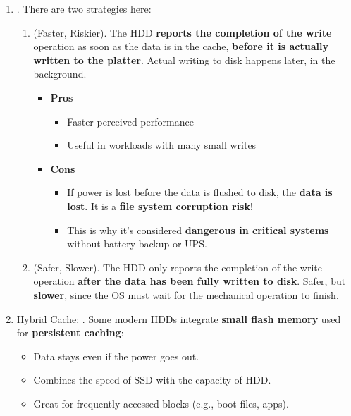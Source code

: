 \begin{enumerate}
    \item {}. There are two strategies here:
    \begin{enumerate}
        \item {} (Faster, Riskier). The HDD \textbf{reports the completion of the write} operation as soon as the data is in the cache, \textbf{before it is actually written to the platter}. Actual writing to disk happens later, in the background.
        \begin{itemize}
            \item[\textcolor{Green3}{\faIcon{check-circle}}] \textcolor{Green3}{\textbf{Pros}}
            \begin{itemize}[label=\textcolor{Green3}{}]
                \item Faster perceived performance
                \item Useful in workloads with many small writes
            \end{itemize}
            \item[\textcolor{Red2}{\faIcon{times-circle}}] \textcolor{Red2}{\textbf{Cons}}
            \begin{itemize}[label=\textcolor{Red2}{}]
                \item If power is lost before the data is flushed to disk, the \textbf{data is lost}. It is a \textbf{file system corruption risk}!
                \item This is why it's considered \textbf{dangerous in critical systems} without battery backup or UPS.
            \end{itemize}
        \end{itemize}
        
        \item {} (Safer, Slower). The HDD only reports the completion of the write operation \textbf{after the data has been fully written to disk}. Safer, but \textbf{slower}, since the OS must wait for the mechanical operation to finish.
    \end{enumerate}

    
    \item Hybrid Cache: . Some modern HDDs integrate \textbf{small flash memory} used for \textbf{persistent caching}:
    \begin{itemize}
        \item Data stays even if the power goes out.
        \item Combines the speed of SSD with the capacity of HDD.
        \item Great for frequently accessed blocks (e.g., boot files, apps).
    \end{itemize}
\end{enumerate}

